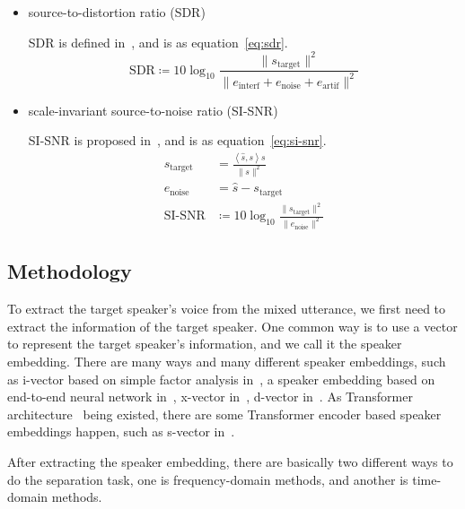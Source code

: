 \begin{itemize}
    \item source-to-distortion ratio (SDR)

    SDR is defined in~\cite{performance_measurement}, and is as equation~\ref{eq:sdr}.
    \begin{equation}
        \text{SDR} \coloneqq 10\log_{10}\frac{\| s_{\text{target}} \|^2}{\| e_{\text{interf}} + e_{\text{noise}} + e_{\text{artif}} \|^2}
        \label{eq:sdr}
    \end{equation}

    \item scale-invariant source-to-noise ratio (SI-SNR)

    SI-SNR is proposed in~\cite{tasnet}, and is as equation~\ref{eq:si-snr}.
    \begin{equation}
        \begin{aligned}
            s_{\text{target}} &= \frac{\left< \hat{s}, s \right>s}{\| s \|^2} \\
            e_{\text{noise}} &= \hat{s} - s_{\text{target}} \\
            \text{SI-SNR} &\coloneqq 10\log_{10}\frac{\| s_{\text{target}} \|^2}{\| e_{\text{noise}} \|^2}
        \end{aligned}\label{eq:si-snr}
    \end{equation}
\end{itemize}

\subsection{Methodology}\label{subsec:methodology}

To extract the target speaker's voice from the mixed utterance, we first need to extract the information of the target speaker.
One common way is to use a vector to represent the target speaker's information, and we call it the speaker embedding.
There are many ways and many different speaker embeddings, such as i-vector based on simple factor analysis in~\cite{i-vector}, a speaker embedding based on end-to-end neural network in~\cite{deep_speaker}, x-vector in~\cite{x-vector}, d-vector in~\cite{d-vector}.
As Transformer architecture~\cite{attention} being existed, there are some Transformer encoder based speaker embeddings happen, such as s-vector in~\cite{s-vector}.

After extracting the speaker embedding, there are basically two different ways to do the separation task, one is frequency-domain methods, and another is time-domain methods.


